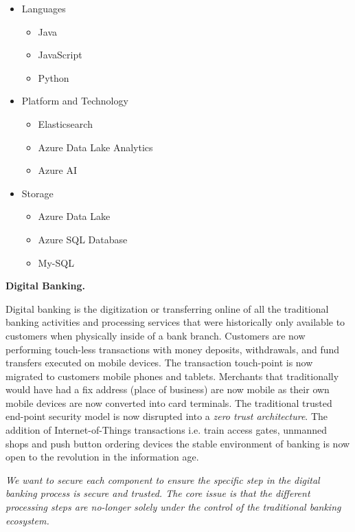 \begin{Workpackage}{\thewpno}
\begin{Task}
\begin{itemize}
    \item Languages
        \begin{itemize}
            \item Java
            \item JavaScript
			\item Python
        \end{itemize}
    \item Platform and Technology
        \begin{itemize}
            \item Elasticsearch
            \item Azure Data Lake Analytics
            \item Azure AI
        \end{itemize}
    \item Storage
        \begin{itemize}
            \item Azure Data Lake
			\item Azure SQL Database
            \item My-SQL
        \end{itemize}
\end{itemize}

\textbf{Digital Banking.}

Digital banking is the digitization or transferring online of all the traditional banking activities and processing services that were historically only available to customers when physically inside of a bank branch. Customers are now performing touch-less transactions with money deposits, withdrawals, and fund transfers executed on mobile devices. The transaction touch-point is now migrated to customers mobile phones and tablets. Merchants that traditionally would have had a fix address (place of business) are now mobile as their own mobile devices are now converted into card terminals. The traditional trusted end-point security model is now disrupted into a \emph{zero trust architecture}. The addition of Internet-of-Things transactions i.e. train access gates, unmanned shops and push button ordering devices the stable environment of banking is now open to the revolution in the information age.

\emph{We want to secure each component to ensure the specific step in the digital banking process is secure and trusted. The core issue is that the different processing steps are no-longer solely under the control of the traditional banking ecosystem.}


\end{Task}
\end{Workpackage}
